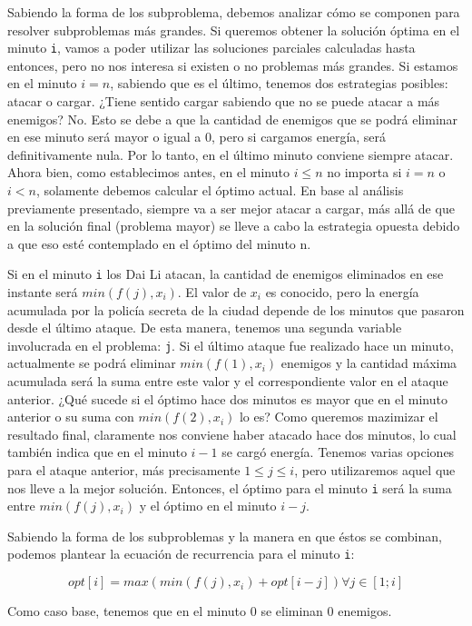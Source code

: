 \documentclass{article}
\begin{document}
Sabiendo la forma de los subproblema, debemos analizar cómo se componen para resolver subproblemas más grandes. Si queremos obtener la solución óptima en el minuto \texttt{i}, vamos a poder utilizar las soluciones parciales calculadas hasta entonces, pero no nos interesa si existen o no problemas más grandes. Si estamos en el minuto $i = n$, sabiendo que es el último, tenemos dos estrategias posibles: atacar o cargar. ¿Tiene sentido cargar sabiendo que no se puede atacar a más enemigos? No. Esto se debe a que la cantidad de enemigos que se podrá eliminar en ese minuto será  mayor o igual a 0, pero si cargamos energía, será definitivamente nula. Por lo tanto, en el último minuto conviene siempre atacar. Ahora bien, como establecimos antes, en el minuto $i \leq n$ no importa si $i = n$ o $i < n$, solamente debemos calcular el óptimo actual. En base al análisis previamente presentado, siempre va a ser mejor atacar a cargar, más allá de que en la solución final (problema mayor) se lleve a cabo la estrategia opuesta debido a que eso esté contemplado en el óptimo del minuto n. 

Si en el minuto \texttt{i} los Dai Li atacan, la cantidad de enemigos eliminados en ese instante será $min(f(j), x_i)$. El valor de $x_i$ es conocido, pero la energía acumulada por la policía secreta de la ciudad depende de los minutos que pasaron desde el último ataque. De esta manera, tenemos una segunda variable involucrada en el problema: \texttt{j}. Si el último ataque fue realizado hace un minuto, actualmente se podrá eliminar $min(f(1), x_i)$ enemigos y la cantidad máxima acumulada será la suma entre este valor y el correspondiente valor en el ataque anterior. ¿Qué sucede si el óptimo hace dos minutos es mayor que en el minuto anterior o su suma con $min(f(2), x_i)$ lo es? Como queremos mazimizar el resultado final, claramente nos conviene haber atacado hace dos minutos, lo cual también indica que en el minuto $i - 1$ se cargó energía. Tenemos varias opciones para el ataque anterior, más precisamente $1 \leq j \leq i$, pero utilizaremos aquel que nos lleve a la mejor solución. Entonces, el óptimo para el minuto \texttt{i} será la suma entre $min(f(j), x_i)$ y el óptimo en el minuto $i - j$.

Sabiendo la forma de los subproblemas y la manera en que éstos se combinan, podemos plantear la ecuación de recurrencia para el minuto \texttt{i}:

$$opt[i] = max(min(f(j), x_i) + opt[i - j]) \forall j \in [1; i]$$

Como caso base, tenemos que en el minuto 0 se eliminan 0 enemigos.
\end{document}
